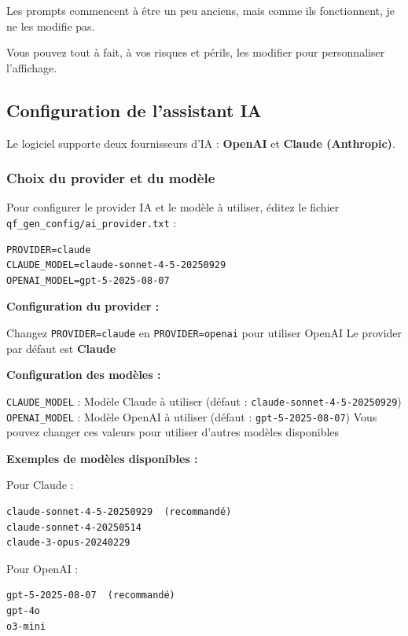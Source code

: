 Les prompts commencent à être un peu anciens, mais comme ils fonctionnent, je ne les modifie pas.

Vous pouvez tout à fait, à vos risques et périls, les modifier pour personnaliser l'affichage.

\subsection{Configuration de l'assistant IA}

Le logiciel supporte deux fournisseurs d'IA : \textbf{OpenAI} et \textbf{Claude (Anthropic)}.

\subsubsection{Choix du provider et du modèle}

Pour configurer le provider IA et le modèle à utiliser, éditez le fichier \texttt{qf\_gen\_config/ai\_provider.txt} :

\begin{lstlisting}
PROVIDER=claude
CLAUDE_MODEL=claude-sonnet-4-5-20250929
OPENAI_MODEL=gpt-5-2025-08-07
\end{lstlisting}

\textbf{Configuration du provider :}
\begin{tcbenumerate}
    \tcbitem Changez \texttt{PROVIDER=claude} en \texttt{PROVIDER=openai} pour utiliser OpenAI
    \tcbitem Le provider par défaut est \textbf{Claude}
\end{tcbenumerate}

\textbf{Configuration des modèles :}
\begin{tcbenumerate}
    \tcbitem \texttt{CLAUDE\_MODEL} : Modèle Claude à utiliser (défaut : \texttt{claude-sonnet-4-5-20250929})
    \tcbitem \texttt{OPENAI\_MODEL} : Modèle OpenAI à utiliser (défaut : \texttt{gpt-5-2025-08-07})
    \tcbitem Vous pouvez changer ces valeurs pour utiliser d'autres modèles disponibles
\end{tcbenumerate}

\textbf{Exemples de modèles disponibles :}

Pour Claude :
\begin{lstlisting}
claude-sonnet-4-5-20250929  (recommandé)
claude-sonnet-4-20250514
claude-3-opus-20240229
\end{lstlisting}

Pour OpenAI :
\begin{lstlisting}
gpt-5-2025-08-07  (recommandé)
gpt-4o
o3-mini
\end{lstlisting}

